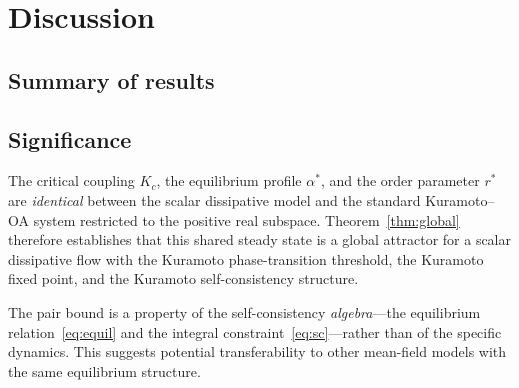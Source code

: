 \documentclass[11pt,a4paper]{article}
\theoremstyle{definition}
\begin{document}
\section{Discussion}\label{sec:discussion}

\subsection{Summary of results}

\begin{center}
\small
{}
\end{center}

\subsection{Significance}

The critical coupling $K_c$, the equilibrium profile $\alpha^*$, and the order parameter $r^*$ are \emph{identical} between the scalar dissipative model and the standard Kuramoto--OA system restricted to the positive real subspace. Theorem~\ref{thm:global} therefore establishes that this shared steady state is a global attractor for a scalar dissipative flow with the Kuramoto phase-transition threshold, the Kuramoto fixed point, and the Kuramoto self-consistency structure.

The pair bound is a property of the self-consistency \emph{algebra}---the equilibrium relation~\eqref{eq:equil} and the integral constraint~\eqref{eq:sc}---rather than of the specific dynamics. This suggests potential transferability to other mean-field models with the same equilibrium structure.
\end{document}

